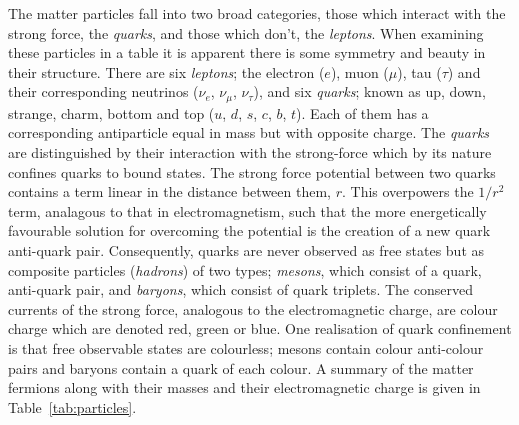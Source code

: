 The matter particles fall into two broad categories, those which interact with the strong force, the \textit{quarks}, and those which don't, the \textit{leptons}. When examining these particles in a table it is apparent there is some symmetry and beauty in their structure. There are six \textit{leptons}; the electron ($e$), muon ($\mu$), tau ($\tau$) and their corresponding neutrinos ($\nu_{e}$, $\nu_{\mu}$, $\nu_{\tau}$), and six \textit{quarks}; known as up, down, strange, charm, bottom and top ($u$, $d$, $s$, $c$, $b$, $t$). Each of them has a corresponding antiparticle equal in mass but with opposite charge. The \textit{quarks} are distinguished by their interaction with the strong-force which by its nature confines quarks to bound states. The strong force potential between two quarks contains a term linear in the distance between them, $r$. This overpowers the $1/r^{2}$ term, analagous to that in electromagnetism, such that the more energetically favourable solution for overcoming the potential is the creation of a new quark anti-quark pair. Consequently, quarks are never observed as free states but as composite particles (\textit{hadrons}) of two types; \textit{mesons}, which consist of a quark, anti-quark pair, and \textit{baryons}, which consist of quark triplets. The conserved currents of the strong force, analogous to the electromagnetic charge, are colour charge which are denoted red, green or blue. One realisation of quark confinement is that free observable states are colourless; mesons contain colour anti-colour pairs and baryons contain a quark of each colour. A summary of the matter fermions along with their masses and their electromagnetic charge is given in Table~\ref{tab:particles}.

